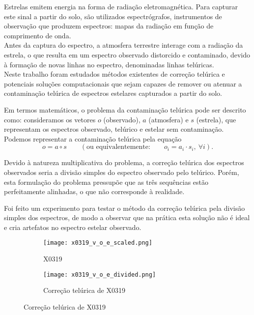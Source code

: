 \documentclass[a1]{sciposter}
\begin{document}
\begin{multicols}{2}


Estrelas emitem energia na forma de radiação eletromagnética. Para capturar este sinal a partir do solo, são utilizados espectrógrafos, instrumentos de observação que produzem espectros: mapas da radiação em função de comprimento de onda.\\

Antes da captura do espectro, a atmosfera terrestre interage com a radiação da estrela, o que resulta em um espectro observado distorcido e contaminado, devido à formação de novas linhas no espectro, denominadas linhas telúricas.\\

Neste trabalho foram estudados métodos existentes de correção telúrica e potenciais soluções computacionais que sejam capazes de remover ou atenuar a contaminação telúrica de espectros estelares capturados a partir do solo.


Em termos matemáticos, o problema da contaminação telúrica pode ser descrito como: consideramos os vetores $o$ (observado), $a$ (atmosfera) e $s$ (estrela), que representam os espectros observado, telúrico e estelar sem contaminação. Podemos representar a contaminação telúrica pela equação
\begin{equation*}
    o = a \circ s \qquad \left(\mbox{ou equivalentemente:} \qquad o_i = a_i\cdot s_i,\ \forall i\right).
\end{equation*}

Devido à natureza multiplicativa do problema, a correção telúrica dos espectros observados seria a divisão simples do espectro observado pelo telúrico. Porém, esta formulação do problema pressupõe que as três sequências estão perfeitamente alinhadas, o que não corresponde à realidade.


Foi feito um experimento para testar o método da correção telúrica pela divisão simples dos espectros, de modo a observar que na prática esta solução não é ideal e cria artefatos no espectro estelar observado.

\begin{figure}
 \centering
 \begin{subfigure}{0.4\textwidth}
  \centering
  \texttt{[image: x0319\_v\_o\_e\_scaled.png]}
  \caption{X0319}
 \end{subfigure}\hfil
 \begin{subfigure}{0.4\textwidth}
  \centering
  \texttt{[image: x0319\_v\_o\_e\_divided.png]}
  \caption{Correção telúrica de X0319}
 \end{subfigure}\hfil
\end{figure}


\end{multicols}
\end{document}
